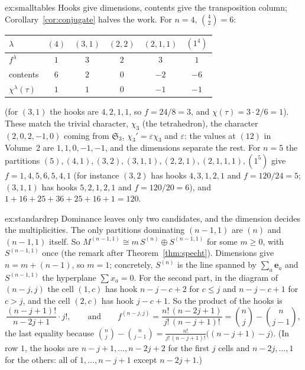 \begin{solution}{ex:smalltables}
\idea Hooks give dimensions, contents give the transposition column; Corollary~\ref{cor:conjugate} halves the work.
\writeup For $n=4$, $\binom42=6$:
\begin{center}
\begin{tabular}{@{}l@{\enspace}c@{\enspace}c@{\enspace}c@{\enspace}c@{\enspace}c@{}}
$\lambda$ & $(4)$ & $(3,1)$ & $(2,2)$ & $(2,1,1)$ & $(1^4)$\\\hline
$f^\lambda$ & $1$ & $3$ & $2$ & $3$ & $1$\\
contents & $6$ & $2$ & $0$ & $-2$ & $-6$\\
$\chi^\lambda(\tau)$ & $1$ & $1$ & $0$ & $-1$ & $-1$
\end{tabular}
\end{center}
(for $(3,1)$ the hooks are $4,2,1,1$, so $f=24/8=3$, and $\chi(\tau)=3\cdot2/6=1$). These match the trivial character, $\chi_3$ (the tetrahedron), the character $(2,0,2,-1,0)$ coming from $\mathfrak S_3$, $\chi_3'=\varepsilon\chi_3$ and $\varepsilon$:
the values at $(12)$ in Volume~2 are $1,1,0,-1,-1$, and the dimensions separate the rest. For $n=5$ the partitions $(5),(4,1),(3,2),(3,1,1),(2,2,1),(2,1,1,1),(1^5)$ give $f=1,4,5,6,5,4,1$ (for instance $(3,2)$ has hooks $4,3,1,2,1$ and $f=120/24=5$; $(3,1,1)$ has hooks $5,2,1,2,1$ and
$f=120/20=6$), and $1+16+25+36+25+16+1=120$.
\end{solution}

\begin{solution}{ex:standardrep}
\idea Dominance leaves only two candidates, and the dimension decides the multiplicities.
\writeup The only partitions dominating $(n-1,1)$ are $(n)$ and $(n-1,1)$ itself. So $M^{(n-1,1)}\cong m\,S^{(n)}\oplus S^{(n-1,1)}$ for some $m\ge0$, with $S^{(n-1,1)}$ once (the remark after Theorem~\ref{thm:specht}). Dimensions give $n=m+(n-1)$, so $m=1$;
concretely, $S^{(n)}$ is the line spanned by $\sum_a\mathbf e_a$ and $S^{(n-1,1)}$ the hyperplane $\sum x_a=0$. For the second part, in the diagram of $(n-j,j)$ the cell $(1,c)$ has hook $n-j-c+2$ for $c\le j$ and $n-j-c+1$ for $c>j$, and the cell $(2,c)$ has hook $j-c+1$.
So the product of the hooks is
\[
\frac{(n-j+1)!}{n-2j+1}\cdot j!,\qquad\text{and}\qquad f^{(n-j,j)}=\frac{n!\,(n-2j+1)}{j!\,(n-j+1)!}=\binom nj-\binom n{j-1},
\]
the last equality because $\binom nj-\binom n{j-1}=\frac{n!}{j!\,(n-j+1)!}\bigl((n-j+1)-j\bigr)$. (In row $1$, the hooks are $n-j+1,\dots,n-2j+2$ for the first $j$ cells and $n-2j,\dots,1$ for the others: all of $1,\dots,n-j+1$ except $n-2j+1$.)
\end{solution}

